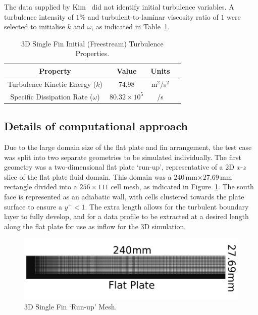 The data supplied by Kim~\cite{kim1991} did not identify initial turbulence variables. A turbulence intensity of $1\%$ and turbulent-to-laminar viscosity ratio of $1$ were selected to initialise $k$ and $\omega$, as indicated in Table~\ref{t:tc2:turb}.
%
\begin{table}[htbp]
  
  \caption{3D Single Fin Initial (Freestream) Turbulence Properties.}
  \label{t:tc2:turb}
  \begin{center}
  \begin{tabular}{cccl}
  \hline\hline
     Property  & Value & Units \\
  \hline
    Turbulence Kinetic Energy ($k$)  & $74.98$ & m$^2$/s$^2$  \\
    Specific Dissipation Rate ($\omega$)  & $80.32\times10^5$ & /s  \\
  \hline\hline
  \end{tabular}
  \end{center}
\end{table}
%

\subsection{Details of computational approach}

Due to the large domain size of the flat plate and fin arrangement, the test case was split into two separate geometries to be simulated individually. The first geometry was a two-dimensional flat plate `run-up', representative of a 2D $x$-$z$ slice of the flat plate fluid domain. This domain was a $240$\,mm$\times27.69$\,mm rectangle divided into a $256\times111$ cell mesh, as indicated in Figure~\ref{f:tc2:runup}. The south face is represented as an adiabatic wall, with cells clustered towards the plate surface to ensure a $y^+<1$. The extra length allows for the turbulent boundary layer to fully develop, and for a data profile to be extracted at a desired length along the flat plate for use as inflow for the 3D simulation. 
%
\begin{figure}[htbp]
 \begin{center}
  \includegraphics[width=12cm]{./chap7-3Dsinglefin/figs/tc2-runup.png}
  \caption{3D Single Fin `Run-up' Mesh.}
  \label{f:tc2:runup}
 \end{center}
\end{figure}
%


